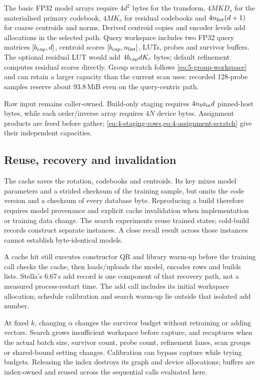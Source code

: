 The basic FP32 model arrays require $4d^2$ bytes for the transform,
$4MKD_s$ for the materialised primary codebook, $4MK_r$ for residual
codebooks and $4n_{\rm list}(d+1)$ for coarse centroids and norms.
Derived centroid copies and encoder levels add allocations in the
selected path. Query workspace includes two FP32 query matrices
$[b_{\rm cap},d]$, centroid scores $[b_{\rm cap},n_{\rm list}]$, LUTs,
probes and survivor buffers. The optional residual LUT would add
$4b_{\rm cap}dK_r$ bytes; default refinement computes residual scores
directly. Group scratch follows \cref{eq:5-group-workspace} and can retain
a larger capacity than the current scan uses: recorded 128-probe samples
reserve about 93.8\,MiB even on the query-centric path.

Raw input remains caller-owned. Build-only staging requires
$4n_ba_{\rm in}d$ pinned-host bytes, while each order/inverse array
requires $4N$ device bytes. Assignment products are freed before gather;
\cref{eq:4-staging-rows,eq:4-assignment-scratch} give their independent
capacities.

\subsection{Reuse, recovery and invalidation}

The cache saves the rotation, codebooks and centroids. Its key mixes model
parameters and a strided checksum of the training sample, but omits the
code version and a checksum of every database byte. Reproducing a build
therefore requires model provenance and explicit cache invalidation when
implementation or training data change. The search experiments reuse
trained states; cold-build records construct separate instances. A close
recall result across those instances cannot establish byte-identical
models.

A cache hit still executes constructor QR and library warm-up before the
training call checks the cache, then loads/uploads the model, encodes
rows and builds lists. Stella's 6.67\,s add record is one component of that
recovery path, not a measured process-restart time. The add call includes its initial workspace allocation; schedule
calibration and search warm-up lie outside that isolated add number.

At fixed $k$, changing $\alpha$ changes the survivor budget without
retraining or adding vectors. Search grows insufficient workspace before
capture, and recaptures when the actual batch size, survivor count,
probe count, refinement lanes, scan groups or shared-bound setting
changes. Calibration can bypass capture while trying budgets. Releasing
the index destroys its graph and device allocations; buffers are
index-owned and reused across the sequential calls evaluated here.
